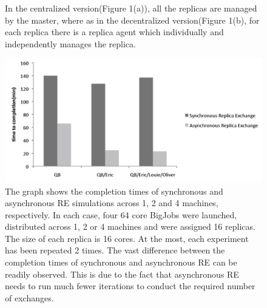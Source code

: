 \documentclass[a4paper,10pt]{article}
\begin{document}
\begin{figure}
\centering
{}
\caption{\small In the centralized version(Figure 1(a)), all the replicas are managed by the master, where as in the decentralized version(Figure 1(b), for each replica there is a replica agent which individually and independently manages the replica.}
\label{fig:async}
\end{figure}

%
\begin{figure}
\centering
\includegraphics[scale=0.25]{figures/combined_graph.pdf}
\caption{\small The graph shows the completion times of synchronous and asynchronous RE simulations across 1, 2 and 4 machines, respectively. In each case, four 64 core BigJobs were launched, distributed across 1, 2 or 4 machines and were assigned 16 replicas. The size of each replica is 16 cores. At the most, each experiment has been repeated 2 times. The vast difference between the completion times of synchronous and asynchronous RE can be  readily observed. This is due to the fact that asynchronous RE needs to run much fewer iterations to conduct the required number of exchanges. }
\label{fig:graph}
\vspace{-1em}
\end{figure}
\end{document}
